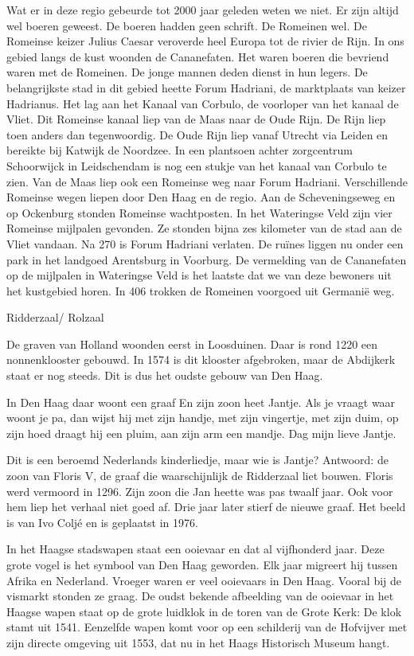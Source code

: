 \documentclass[
  a4paper,
]{book}
\theoremstyle{definition}
\theoremstyle{definition}
\theoremstyle{definition}
\theoremstyle{definition}
\theoremstyle{remark}
\begin{document}
Wat er in deze regio gebeurde tot 2000 jaar geleden weten we niet.
Er zijn altijd wel boeren geweest. De boeren hadden geen schrift. De Romeinen wel.
De Romeinse keizer Julius Caesar veroverde heel Europa tot de rivier de Rijn.
In ons gebied langs de kust woonden de Cananefaten.
Het waren boeren die bevriend waren met de Romeinen.
De jonge mannen deden dienst in hun legers.
De belangrijkste stad in dit gebied heette Forum Hadriani, de marktplaats van keizer Hadrianus.
Het lag aan het Kanaal van Corbulo, de voorloper van het kanaal de Vliet.
Dit Romeinse kanaal liep van de Maas naar de Oude Rijn.
De Rijn liep toen anders dan tegenwoordig.
De Oude Rijn liep vanaf Utrecht via Leiden en bereikte bij Katwijk de Noordzee.
In een plantsoen achter zorgcentrum Schoorwijck in Leidschendam is nog een stukje van het kanaal van Corbulo te zien.
Van de Maas liep ook een Romeinse weg naar Forum Hadriani.
Verschillende Romeinse wegen liepen door Den Haag en de regio.
Aan de Scheveningseweg en op Ockenburg stonden Romeinse wachtposten.
In het Wateringse Veld zijn vier Romeinse mijlpalen gevonden.
Ze stonden bijna zes kilometer van de stad aan de Vliet vandaan.
Na 270 is Forum Hadriani verlaten.
De ruïnes liggen nu onder een park in het landgoed Arentsburg in Voorburg.
De vermelding van de Cananefaten op de mijlpalen in Wateringse Veld is het laatste dat we van deze bewoners uit het kustgebied horen.
In 406 trokken de Romeinen voorgoed uit Germanië weg.

Ridderzaal/ Rolzaal

De graven van Holland woonden eerst in Loosduinen. Daar is rond 1220 een nonnenklooster gebouwd. In 1574 is dit klooster afgebroken, maar de Abdijkerk staat er nog steeds. Dit is dus het oudste gebouw van Den Haag.

In Den Haag daar woont een graaf
En zijn zoon heet Jantje.
Als je vraagt waar woont je pa,
dan wijst hij met zijn handje,
met zijn vingertje, met zijn duim,
op zijn hoed draagt hij een pluim,
aan zijn arm een mandje.
Dag mijn lieve Jantje.

Dit is een beroemd Nederlands kinderliedje,
maar wie is Jantje?
Antwoord: de zoon van Floris V, de graaf die waarschijnlijk de Ridderzaal liet bouwen. Floris werd vermoord in 1296. Zijn zoon die Jan heette was pas twaalf jaar. Ook voor hem liep het verhaal niet goed af. Drie jaar later stierf de nieuwe graaf.
Het beeld is van Ivo Coljé en is geplaatst in 1976.

In het Haagse stadswapen staat een ooievaar en dat al vijfhonderd jaar. Deze grote vogel is het symbool van Den Haag geworden. Elk jaar migreert hij tussen Afrika en Nederland. Vroeger waren er veel ooievaars in Den Haag. Vooral bij de vismarkt stonden ze graag.
De oudst bekende afbeelding van de ooievaar in het Haagse wapen staat op de grote luidklok in de toren van de Grote Kerk: De klok stamt uit 1541. Eenzelfde wapen komt voor op een schilderij van de Hofvijver met zijn directe omgeving uit 1553, dat nu in het Haags Historisch Museum hangt.
\end{document}
